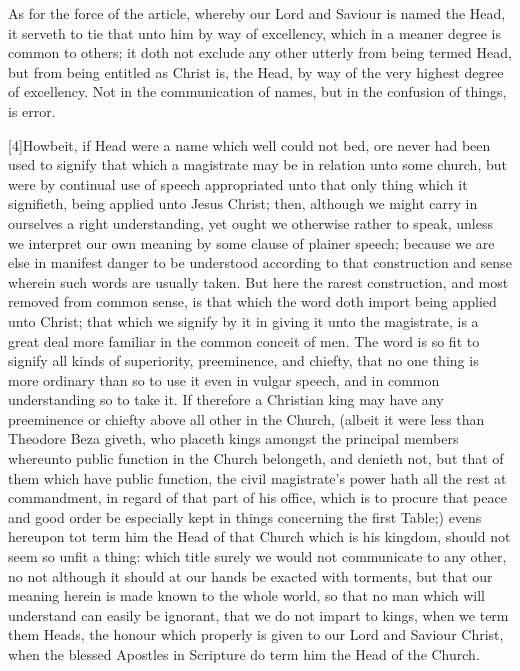 As for the force of the article, whereby our Lord and Saviour is named the Head, it serveth to tie that unto him by way of excellency, which in a meaner degree is common to others; it doth not exclude any other utterly from being termed Head, but from being entitled as Christ is, the Head, by way of the very highest degree of excellency. Not in the communication of names, but in the confusion of things, is error.

[4]Howbeit, if Head were a name which well could not bed, ore never had been used to signify that which a magistrate may be in relation unto some church, but were by continual use of speech appropriated unto that only thing which it signifieth, being applied unto Jesus Christ; then, although we might carry in ourselves a right understanding, yet ought we otherwise rather to speak, unless we interpret our own meaning by some clause of plainer speech; because  we are else in manifest danger to be understood according to that construction and sense wherein such words are usually taken. But here the rarest construction, and most removed from common sense, is that which the word doth import being applied unto Christ; that which we signify by it in giving it unto the magistrate, is a great deal more familiar in the common conceit of men. The word is so fit to signify all kinds of superiority, preeminence, and chiefty, that no one thing is more ordinary than so to use it even in vulgar speech, and in common understanding so to take it. If therefore a Christian king may have any preeminence or chiefty above all other in the Church, (albeit it were less than Theodore Beza giveth, who placeth kings amongst the principal members whereunto public function in the Church belongeth, and denieth not, but that of them which have public function, the civil magistrate’s power hath all the rest at commandment, in regard of that part of his office, which is to procure that peace and good order be especially kept in things concerning the first Table;) evens hereupon tot term him the Head of that Church which is his kingdom, should not seem so unfit a thing: which title surely we would not communicate to any other, no not although it should at our hands be exacted with torments, but that our meaning herein is made known to the whole world, so that no man which will understand can easily be ignorant, that we do not impart to kings, when we term them Heads, the honour which properly is given to our Lord and Saviour  Christ, when the blessed Apostles in Scripture do term him the Head of the Church.


